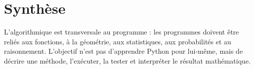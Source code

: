 \section{Synthèse}

L'algorithmique est transversale au programme : les programmes doivent être reliés aux fonctions, à la géométrie, aux statistiques, aux probabilités et au raisonnement. L'objectif n'est pas d'apprendre Python pour lui-même, mais de décrire une méthode, l'exécuter, la tester et interpréter le résultat mathématique.
